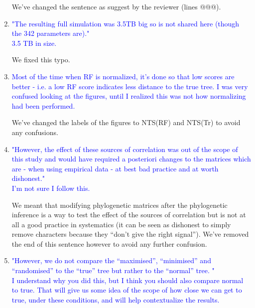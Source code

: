 \documentclass[12pt,letterpaper]{article}
\begin{document}
\begin{enumerate}
We've changed the sentence as suggest by the reviewer (lines @@@).

\item{\textcolor{blue}{"The resulting full simulation was 3.5TB big so is not shared here (though the 342 parameters are)."\\
3.5 TB in size.}}

We fixed this typo.

\item{\textcolor{blue}{Most of the time when RF is normalized, it's done so that low scores are better - i.e. a low RF score indicates less distance to the true tree. I was very confused looking at the figures, until I realized this was not how normalizing had been performed. }}

We've changed the labels of the figures to NTS(RF) and NTS(Tr) to avoid any confusions.

\item{\textcolor{blue}{"However, the effect of these sources of correlation was out of the scope of this study and would have required a posteriori changes to the matrices which are - when using empirical data - at best bad practice and at worth dishonest."\\
I'm not sure I follow this.}}
\label{dishonest}

We meant that modifying phylogenetic matrices after the phylogenetic inference is a way to test the effect of the sources of correlation but is not at all a good practice in systematics (it can be seen as dishonest to simply remove characters because they ``don't give the right signal''). We've removed the end of this sentence however to avoid any further confusion.

\item{\textcolor{blue}{"However, we do not compare the ``maximised'', ``minimised'' and ``randomised'' to the ``true'' tree but rather to the ``normal'' tree. "\\
I understand why you did this, but I think you should also compare normal to true. That will give us some idea of the scope of how close we can get to true, under these conditions, and will help contextualize the results.}}



\end{enumerate}





%
%
\end{document}
